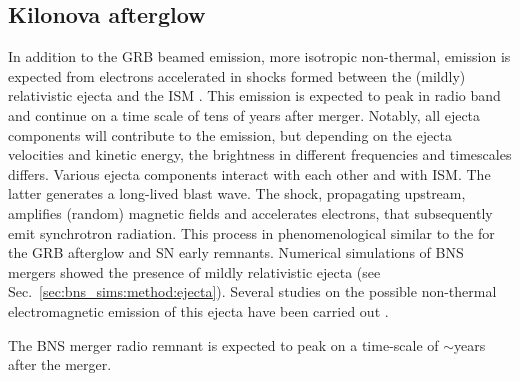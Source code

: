 \subsection{Kilonova afterglow}

In addition to the \ac{GRB} beamed emission, more isotropic non-thermal,
emission is expected from electrons accelerated in shocks formed between the 
(mildly) relativistic ejecta and the \ac{ISM} \citep{Nakar:2011cw}. This emission 
is expected to peak in radio band and continue on a time scale of tens of years 
after merger. Notably, all ejecta components will contribute to the emission, 
but depending on the ejecta velocities and kinetic energy, 
the brightness in different frequencies and timescales differs. 
%
Various ejecta components interact with each other and with \ac{ISM}. The latter 
generates a long-lived blast wave. The shock, propagating upstream, amplifies 
(random) magnetic fields and accelerates electrons, that subsequently emit 
synchrotron radiation. This process in phenomenological similar to the for the 
\ac{GRB} afterglow and \ac{SN} early remnants. 
%
Numerical simulations of \ac{BNS} mergers showed the presence of mildly relativistic 
ejecta (see Sec.~\ref{sec:bns_sims:method:ejecta}). 
Several studies on the possible non-thermal electromagnetic emission of this ejecta 
have been carried out 
\citep[\eg][]{Piran:2012wd,Hotokezaka:2015eja,Hotokezaka:2018gmo,Radice:2018pdn}. 


The \ac{BNS} merger radio remnant is expected to peak on a time-scale 
of ${\sim}$years after the merger.%
%

